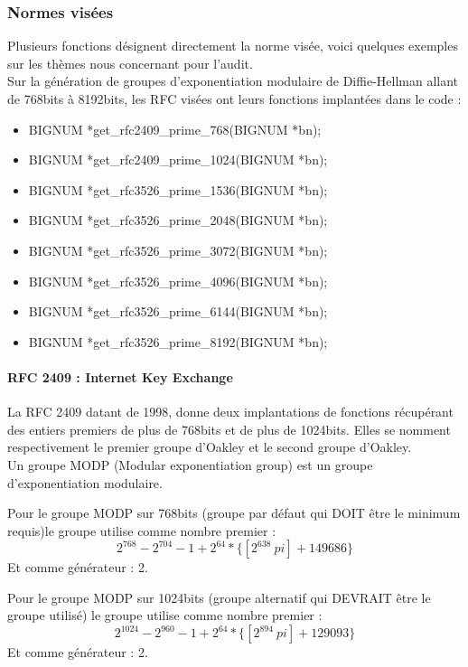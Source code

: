 		\subsubsection{Normes visées}

			Plusieurs fonctions désignent directement la norme visée, voici quelques exemples sur les thèmes nous concernant pour l'audit.\\
			Sur la génération de groupes d'exponentiation modulaire de Diffie-Hellman allant de 768bits à 8192bits, les RFC visées  \cite{rfc2409} \cite{rfc3526} ont leurs fonctions implantées dans le code :
			\begin{itemize}
			\item BIGNUM *get\_rfc2409\_prime\_768(BIGNUM *bn);
			\item BIGNUM *get\_rfc2409\_prime\_1024(BIGNUM *bn);
			\item BIGNUM *get\_rfc3526\_prime\_1536(BIGNUM *bn);
			\item BIGNUM *get\_rfc3526\_prime\_2048(BIGNUM *bn);
			\item BIGNUM *get\_rfc3526\_prime\_3072(BIGNUM *bn);
			\item BIGNUM *get\_rfc3526\_prime\_4096(BIGNUM *bn);
			\item BIGNUM *get\_rfc3526\_prime\_6144(BIGNUM *bn);
			\item BIGNUM *get\_rfc3526\_prime\_8192(BIGNUM *bn);
			\end{itemize}

			\paragraph{RFC 2409 : Internet Key Exchange\\}

			La RFC 2409 \cite{rfc2409} datant de 1998, donne deux implantations de fonctions récupérant des entiers premiers de plus de 768bits et de plus de 1024bits. Elles se nomment respectivement le premier groupe d'Oakley et le second groupe d'Oakley.\\

			Un groupe MODP (Modular exponentiation group) est un groupe d'exponentiation modulaire.

			Pour le groupe MODP sur 768bits (groupe par défaut qui DOIT être le minimum requis)le groupe utilise comme nombre premier : 
			$$ 2^{768} - 2^{704} - 1 + 2^{64} * \{[2^638\ pi] + 149686\}$$
			Et comme générateur : 2.

			Pour le groupe MODP sur 1024bits (groupe alternatif qui DEVRAIT être le groupe utilisé) le groupe utilise comme nombre premier :
			$$ 2^{1024} - 2^{960} - 1 + 2^{64} * \{[2^894\ pi] + 129093\}$$
			Et comme générateur : 2. 

